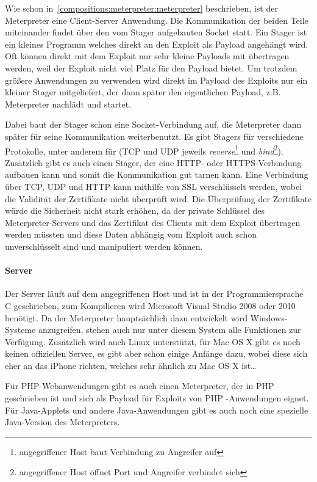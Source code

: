 Wie schon in~\ref{compositions:meterpreter:meterpreter} beschrieben, ist
der Meterpreter eine Client-Server Anwendung. Die Kommunikation der
beiden Teile miteinander findet über den vom Stager aufgebauten Socket
statt. Ein Stager ist ein kleines Programm welches direkt an den Exploit
als Payload angehängt wird. Oft können direkt mit dem Exploit nur sehr
kleine Payloads mit übertragen werden, weil der Exploit nicht viel Platz
für den Payload bietet. Um trotzdem größere Anwendungen zu verwenden
wird direkt im Payload des Exploits nur ein kleiner Stager mitgeliefert,
der dann später den eigentlichen Payload, z.B. Meterpreter nachlädt und
startet.

Dabei baut der Stager schon eine Socket-Verbindung auf, die Meterpreter
dann später für seine Kommunikation weiterbenutzt. Es gibt Stagers für
verschiedene Protokolle, unter anderem für (TCP und UDP jeweils
\textit{reverse}\footnote{angegriffener Host baut Verbindung zu
Angreifer auf} und \textit{bind}\footnote{angegriffener Host öffnet Port
und Angreifer verbindet sich}). Zusätzlich gibt es auch einen Stager,
der eine HTTP- oder HTTPS-Verbindung aufbauen kann und somit die
Kommunikation gut tarnen kann. Eine Verbindung über TCP, UDP und HTTP
kann mithilfe von SSL verschlüsselt werden, wobei die Validität der
Zertifikate nicht überprüft wird. Die Überprüfung der Zertifikate würde
die Sicherheit nicht stark erhöhen, da der private Schlüssel des
Meterpreter-Servers und das Zertifikat des Clients mit dem Exploit
übertragen werden müssten und diese Daten abhängig vom Exploit auch
schon unverschlüsselt sind und manipuliert werden können.

\paragraph{Server}

Der Server läuft auf dem angegriffenen Host und ist in der
Programmiersprache C geschrieben, zum Kompilieren wird Microsoft Visual
Studio 2008 oder 2010 benötigt. Da der Meterpreter hauptsächlich dazu
entwickelt wird Windows-Systeme anzugreifen, stehen auch nur unter
diesem System alle Funktionen zur Verfügung. Zusätzlich wird auch
Linux unterstützt, für Mac OS X gibt es noch keinen offiziellen Server,
es gibt aber schon einige Anfänge dazu, wobei diese sich eher an das
iPhone richten, welches sehr ähnlich zu Mac OS X ist\dots

Für PHP-Webanwendungen gibt es auch einen Meterpreter, der in PHP
geschrieben ist und sich als Payload für Exploits von PHP -Anwendungen
eignet. Für Java-Applets und andere Java-Anwendungen gibt es auch noch
eine spezielle Java-Version des Meterpreters.

